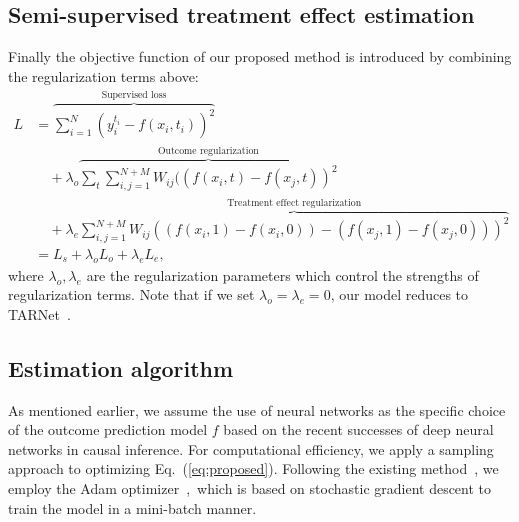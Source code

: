 \subsection{Semi-supervised treatment effect estimation }
Finally the objective function of our proposed method is introduced by combining the regularization terms above:
\footnotesize
\begin{equation}\label{eq:proposed}
\begin{split}
L&=\overbrace{\sum_{i=1}^{N}(y^{t_i}_i-f(x_i, t_i))^{2}}^{\text{Supervised loss}}\\&\quad+\lambda_o\overbrace{\sum_{t}\sum_{i,j=1}^{N+M}W_{ij}((f(x_i, t)-f(x_j, t))^{2}}^{\text{Outcome regularization}}\\ &\quad+\lambda_e\overbrace{\sum_{i,j=1}^{N+M}W_{ij}((f(x_i, 1)-f(x_i, 0)) - (f(x_j, 1)-f(x_j, 0)))^2}^{\text{Treatment effect regularization}}\\
&=L_s+\lambda_{o}L_o+\lambda_{e}L_e,
\end{split}
\end{equation}\normalsize
where $\lambda_o, \lambda_e$ are the regularization parameters which control the strengths of regularization terms. 
Note that if we set $\lambda_o=\lambda_e=0$, our model reduces to TARNet~\cite{shalit2017estimating}. 
\fi

\subsection{Estimation algorithm}
As mentioned earlier, we assume the use of neural networks as the specific choice of the outcome prediction model $f$ based on the recent successes of deep neural networks in causal inference. 
For computational efficiency, we apply a sampling approach to optimizing Eq.~(\ref{eq:proposed}).
Following the existing method~\cite{weston2012deep}, we employ the Adam optimizer~\cite{kingma2014adam},~which is based on stochastic gradient descent to train the model  in a mini-batch manner. 

